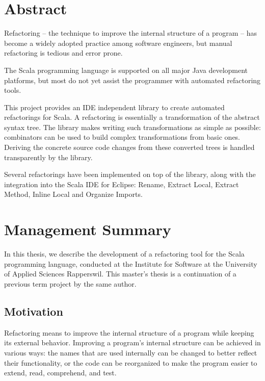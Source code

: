 \documentclass[10pt,a4paper,oneside]{scrreprt}
\begin{document}
\emptypage

\chapter*{Abstract}


Refactoring -- the technique to improve the internal structure of a program -- has become a widely adopted practice among software engineers, but manual refactoring is tedious and error prone. 

The Scala programming language is supported on all major Java development platforms, but most do not yet assist the programmer with automated refactoring tools. 

This project provides an IDE independent library to create automated refactorings for Scala. A refactoring is essentially a transformation of the abstract syntax tree. The library makes writing such transformations as simple as possible: combinators can be used to build complex transformations from basic ones. Deriving the concrete source code changes from these converted trees is handled transparently by the library.

Several refactorings have been implemented on top of the library, along with the integration into the Scala IDE for Eclipse: Rename, Extract Local, Extract Method, Inline Local and Organize Imports.

\chapter*{Management Summary}

In this thesis, we describe the development of a refactoring tool for the Scala programming language, conducted at the Institute for Software at the University of Applied Sciences Rapperswil. This master's thesis is a continuation of a previous term project by the same author.

\section*{Motivation}

Refactoring means to improve the internal structure of a program while keeping its external behavior. Improving a program's internal structure can be achieved in various ways: the names that are used internally can be changed to better reflect their functionality, or the code can be reorganized to make the program easier to extend, read, comprehend, and test. 
\end{document}
